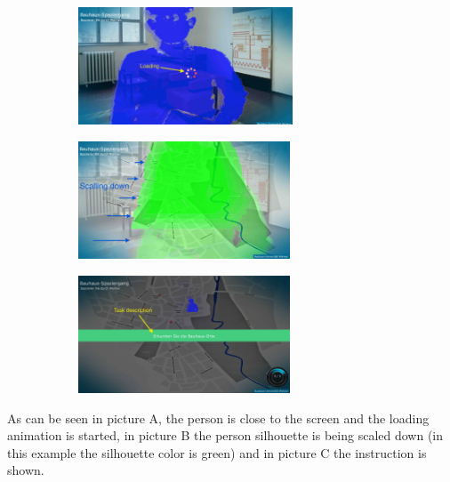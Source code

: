\begin{enumerate}
\begin{figure}[H]
    \centering
    \begin{subfigure}[H]{0.32\textwidth}
        \centering
        \includegraphics[width=\textwidth,height = 3.5cm]{Figures/7/body_interactive/loading}
        \caption{}
        \label{fig:loading_logo}
    \end{subfigure}
    \begin{subfigure}[H]{0.32\textwidth}
        \centering
        \includegraphics[width=\textwidth,height = 3.5cm]{Figures/7/body_interactive/scalling_down}
        \caption{}
        \label{fig:scalling_down}
    \end{subfigure} 
      \begin{subfigure}[H]{0.32\textwidth}
        \centering
        \includegraphics[width=\textwidth,height = 3.5cm]{Figures/7/body_interactive/task_description}
        \caption{}
        \label{fig:task_description}
    \end{subfigure}
    \caption{}
    \label{fig:transition_sequence}
\end{figure}

As can be seen in picture A, the person is close to the screen and the loading animation is started, in picture B the person silhouette is being scaled down (in this example the silhouette color is green) and in picture C the instruction is shown.


\end{enumerate}
